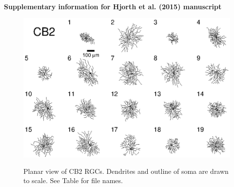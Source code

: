\documentclass{article}
\begin{document}
\pagestyle{empty}


\vspace*{5cm}\\

\begin{center}
  { \Large 
    \textbf{Supplementary information for Hjorth et al. (2015) manuscript}}
\end{center}

\clearpage


\newcommand{\beginsupplement}{%
  \setcounter{table}{0}
  \renewcommand{\thetable}{S\arabic{table}}%
  \setcounter{figure}{0}
  \renewcommand{\thefigure}{S\arabic{figure}}%
}

\beginsupplement

%
%


\begin{figure}[h]
  \centering
  {\includegraphics[scale=1.5]{Figures/SupFig1/CB2-all-cells-1.eps}}
  \caption{Planar view of CB2 RGCs. Dendrites and outline of soma are
    drawn to scale. See Table \protect{\ref{CB2filenames}} for file
    names. \label{CB2planar}}
\end{figure}
\end{document}
